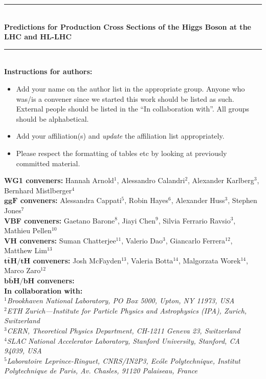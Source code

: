 \documentclass[11pt]{article}
\newcommand{\HRule}{\rule{\linewidth}{0.5mm}}
\begin{document}
\begin{titlepage}
\begin{center}
	\HRule \\[0.9cm]
	\textbf{\Large Predictions for Production Cross Sections of the Higgs Boson at the LHC and HL-LHC} \\[1.0cm]
	\HRule \\[1.5cm]
        {\bf Instructions for authors:} \begin{itemize} \item Add your name on the author list in the appropriate group. Anyone who was/is a convener since we started this work should be listed as such. External people should be listed in the ``In collaboration with''. All groups should be alphabetical. \item Add your affiliation(s) and \emph{update} the affiliation list appropriately. \item Please respect the formatting of tables etc by looking at previously committed material.\end{itemize}
	\textrm{
    {\large {\bf WG1 conveners:} Hannah Arnold$^{1}$, Alessandro Calandri$^{2}$, Alexander Karlberg$^{3}$, Bernhard Mistlberger$^{4}$\\
     {\bf $\boldsymbol{ggF}$ conveners:}  Alessandra Cappati$^{5}$, Robin Hayes$^{6}$, Alexander Huss$^{3}$, Stephen Jones$^{7}$\\
     {\bf VBF conveners:} Gaetano Barone$^{8}$, Jiayi Chen$^{9}$, Silvia Ferrario Ravsio$^{3}$, Mathieu Pellen$^{10}$\\
     {\bf $\boldsymbol{VH}$ conveners:} Suman Chatterjee$^{11}$, Valerio Dao$^{3}$, Giancarlo Ferrera$^{12}$, Matthew Lim$^{13}$\\
     {\bf $\boldsymbol{t\bar{t}H/tH}$ conveners:} Josh McFayden$^{13}$, Valeria Botta$^{14}$, Malgorzata Worek$^{14}$, Marco Zaro$^{12}$\\
     {\bf $\boldsymbol{b\bar{b}H/bH}$ conveners:} \\
     {\bf In collaboration with:} 
    }} \\[0.3cm]	
    \textit{$^{1}$Brookhaven National Laboratory, PO Box 5000, Upton, NY 11973, USA}\\   
    \textit{$^{2}$ETH Zurich—Institute for Particle Physics and Astrophysics (IPA), Zurich, Switzerland}\\
    \textit{$^{3}$CERN, Theoretical Physics Department, CH-1211 Geneva 23, Switzerland } \\
    \textit{$^{4}$SLAC National Accelerator Laboratory, Stanford University, Stanford, CA 94039, USA } \\
    \textit{$^{5}$Laboratoire Leprince-Ringuet, CNRS/IN2P3, Ecóle Polytechnique, Institut Polytechnique de Paris, Av. Chasles, 91120 Palaiseau, France}\\

\end{center}
\end{titlepage}
\end{document}
